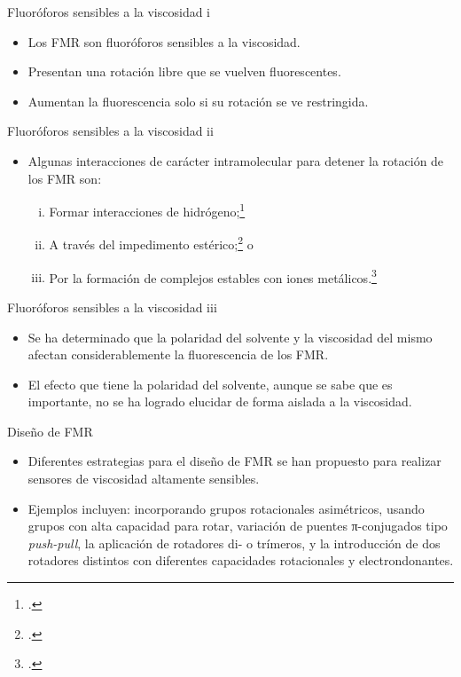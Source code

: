 \documentclass[%
spanish,
mexico]{beamer}
\begin{document}
\begin{frame}{Fluoróforos sensibles a la viscosidad i}
	\begin{itemize}
		\item Los \gls{FMR} son fluoróforos sensibles a la viscosidad.
		\item Presentan una rotación libre que se vuelven fluorescentes.
		\item Aumentan la fluorescencia solo si su rotación se ve restringida.
	\end{itemize}
\end{frame}
\begin{frame}{Fluoróforos sensibles a la viscosidad ii}
	\begin{itemize}
		\item Algunas interacciones de carácter intramolecular para detener la rotación de los \gls{FMR} son:
		      \begin{enumerate}[i.]
			      \item Formar interacciones de hidrógeno;\footcite{wuMultistageRotationalSpeed2018}
			      \item A través del impedimento estérico;\footcite{faulknerAllostericRegulationRotational2016} o
			      \item Por la formación de complejos estables con iones metálicos.\footcite{yadavViscochromicMechanochromicUnsymmetrical2019}
		      \end{enumerate}
	\end{itemize}
\end{frame}

\begin{frame}{Fluoróforos sensibles a la viscosidad iii}
	\begin{itemize}
		\item Se ha determinado que la polaridad del solvente y la viscosidad del mismo afectan considerablemente la fluorescencia de los \gls{FMR}.
		\item El efecto que tiene la polaridad del solvente, aunque se sabe que es importante, no se ha logrado elucidar de forma aislada a la viscosidad.
	\end{itemize}
\end{frame}

\begin{frame}{Diseño de FMR}
    \begin{itemize}
        \item Diferentes estrategias para el diseño de \gls{FMR} se han propuesto para realizar sensores de viscosidad altamente sensibles.
        \item Ejemplos incluyen: incorporando grupos rotacionales asimétricos,\autocite{leePyrrolicMolecularRotors2016} usando grupos con alta capacidad para rotar,\autocite{karpenkoPushPullDioxaborine2016} variación de puentes π-conjugados tipo \emph{push-pull},\autocite{karpenkoPushPullDioxaborine2016} la aplicación de rotadores di- o trímeros,\autocite{kimballBODIPYBODIPYDyad2015} y la introducción de dos rotadores distintos con diferentes capacidades rotacionales y electrondonantes.\autocite{rautTriazinebasedBODIPYTrimer2016}
    \end{itemize}
\end{frame}
\end{document}
